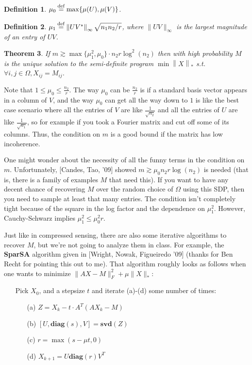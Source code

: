 \documentclass[11pt]{article}
\newcommand{\eqdef}{\mathbin{\stackrel{\rm def}{=}}}
\newcommand{\norm}[1]{\left\| #1 \right\|}
\newtheorem{theorem}{Theorem}
\newtheorem{definition}[theorem]{Definition}
\begin{document}
\begin{definition}
 $\mu_0 \eqdef \max \{ \mu(U), \mu(V) \}$. 
\end{definition}


\begin{definition}
$\mu_1 \eqdef \norm{UV^*}_{\infty}\sqrt{n_1n_2/r}$, where $\|UV\|_\infty$ is the largest magnitude of an entry of $UV$.
\end{definition}

\begin{theorem}
If  $m \gtrsim \max\{\mu_1^2, \mu_0 \} \cdot n_2 r \log^2 (n_2)$ then with high probability $M$ is the unique solution to the semi-definite program $ \min \norm{X}_{*}$ s.t. $\forall i,j\in \Omega, X_{ij} = M_{ij} $.
\end{theorem}
Note that $1 \le \mu_0 \le \frac{n_2}{r}$. The way $\mu_0$ can be $\frac{n_2}{r}$ is if a standard basis vector appears in a column of $V$, and the way $\mu_0$ can get all the way down to $1$ is like the best case scenario where all the entries of $V$ are like $\frac{1}{\sqrt{n_2}}$ and all the entries of $U$ are like $\frac{1}{\sqrt{n_1}}$, so for example if you took a Fourier matrix and cut off some of its columns. Thus, the condition on $m$ is a good bound if the matrix has low incoherence.

One might wonder about the necessity of all the funny terms in the condition on $m$. Unfortunately, [Candes, Tao, '09] \cite{candes2010power} showed $m \gtrsim \mu_0 n_2 r \log(n_2) $ is needed (that is, there is a family of examples $M$ that need this). If you want to have any decent chance of recovering $M$ over the random choice of $\Omega$ using this SDP, then you need to sample at least that many entries. The condition isn't completely tight because of the square in the log factor and the dependence on $\mu_1^2$. However, Cauchy-Schwarz implies $\mu_1^2\le \mu_0^2 r$.

Just like in compressed sensing, there are also some iterative algorithms to recover $M$, but we're not going to analyze them in class. For example, the \textbf{SparSA} algorithm given in [Wright, Nowak, Figueiredo '09] \cite{wright2009sparse} (thanks for Ben Recht for pointing this out to me). That algorithm roughly looks as follows when one wants to minimize $\| A X - M \|_F^2  + \mu \| X \|_*$:
\begin{enumerate}
\item[] Pick $X_0$, and a stepsize $t$ and iterate (a)-(d) some number of times:
\begin{enumerate}
\item[(a)] $Z = X_k-t\cdot A^T(A X_k - M)$
\item[(b)] $[U,\mathbf{diag}(s),V] = \mathbf{svd}(Z)$
\item[(c)] $r = \max(s-\mu t,0)$
\item[(d)] $X_{k+1} = U \mathbf{diag}( r ) V^T$
\end{enumerate}
\end{enumerate}
\end{document}
